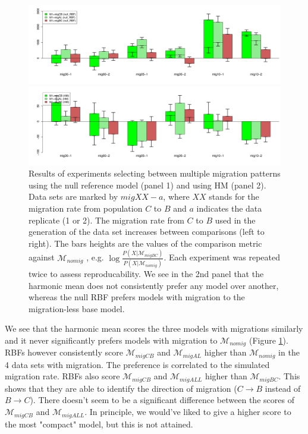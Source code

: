 \documentclass[11pt]{article}
\newcommand{\M}{\mathcal{M}}
\newcommand{\1}{\mathbbm{1}}
\begin{document}
\begin{figure}[H]


\includegraphics[width=1.0\textwidth]{results/results-migCB-select-1}

\includegraphics[width=1.0\textwidth]{results/results-migCB-select-2}
\captionsetup{width=1.0\textwidth}
\caption{
Results of experiments selecting between multiple migration patterns using the null reference model (panel 1) and using HM (panel 2).
%
Data sets are marked by $migXX-a$, where $XX$ stands for the migration rate from population $C$ to $B$ and $a$ indicates the data replicate (1 or 2).
%
The migration rate from $C$ to $B$ used in the generation of the data set increases between comparisons (left to right).
%
The bars heights are the values of the comparison metric against $\M_{nomig}$ , e.g. $\log{ \frac{P(X|\M_{migBC})}{P(X|\M_{nomig})}}$.
%
Each experiment was repeated twice to assess reproducability.
%
We see in the 2nd panel that the harmonic mean does not consistently prefer any model over another, whereas the null RBF prefers models with migration to the migration-less base model. 
}
\label{fig:results-migCB-2}
\end{figure}




We see that the harmonic mean scores the three models with migrations similarly and it never significantly prefers models with migration to $\M_{nomig}$ (Figure \ref{fig:results-migCB-2}).
%
RBFs however consistently score $\M_{migCB}$ and $\M_{migAL}$ higher than $\M_{nomig}$ in the 4 data sets with migration. The preference is correlated to the simulated migration rate. 
%
RBFs also score $\M_{migCB}$ and $\M_{migALL}$ higher than $\M_{migBC}$. This shows that they are able to identify the direction of migration ($C\rightarrow B$ instead of $B \rightarrow C$).
%
There doesn't seem to be a significant difference between the scores of $\M_{migCB}$ and $\M_{migALL}$. In principle, we would've liked to give a higher score to the most "compact" model, but this is not attained.
\end{document}

